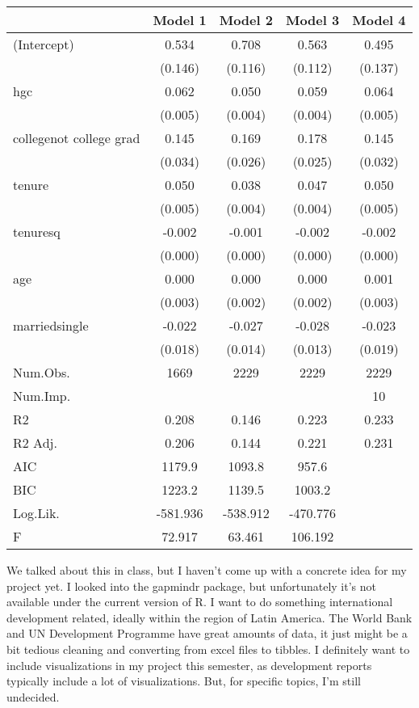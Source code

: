 \documentclass{homework}
\begin{document}
\begin{table}[h]
\centering
\begin{tabular}[t]{lcccc}
\toprule
  & Model 1 & Model 2 & Model 3 & Model 4\\
\midrule
(Intercept) & 0.534 & 0.708 & 0.563 & 0.495\\
 & (0.146) & (0.116) & (0.112) & (0.137)\\
hgc & 0.062 & 0.050 & 0.059 & 0.064\\
 & (0.005) & (0.004) & (0.004) & \vphantom{1} (0.005)\\
collegenot college grad & 0.145 & 0.169 & 0.178 & 0.145\\
 & (0.034) & (0.026) & (0.025) & (0.032)\\
tenure & 0.050 & 0.038 & 0.047 & 0.050\\
 & (0.005) & (0.004) & (0.004) & (0.005)\\
tenuresq & -0.002 & -0.001 & -0.002 & -0.002\\
 & (0.000) & (0.000) & (0.000) & (0.000)\\
age & 0.000 & 0.000 & 0.000 & 0.001\\
 & (0.003) & (0.002) & (0.002) & (0.003)\\
marriedsingle & -0.022 & -0.027 & -0.028 & -0.023\\
 & (0.018) & (0.014) & (0.013) & (0.019)\\
\midrule
Num.Obs. & 1669 & 2229 & 2229 & 2229\\
Num.Imp. &  &  &  & 10\\
R2 & 0.208 & 0.146 & 0.223 & 0.233\\
R2 Adj. & 0.206 & 0.144 & 0.221 & 0.231\\
AIC & 1179.9 & 1093.8 & 957.6 & \\
BIC & 1223.2 & 1139.5 & 1003.2 & \\
Log.Lik. & -581.936 & -538.912 & -470.776 & \\
F & 72.917 & 63.461 & 106.192 & \\
\bottomrule
\end{tabular}
\end{table}

\exercise
We talked about this in class, but I haven't come up with a concrete idea for my project yet. I looked into the gapmindr package, but unfortunately it's not available under the current version of R. I want to do something international development related, ideally within the region of Latin America. The World Bank and UN Development Programme have great amounts of data, it just might be a bit tedious cleaning and converting from excel files to tibbles. I definitely want to include visualizations in my project this semester, as development reports typically include a lot of visualizations. But, for specific topics, I'm still undecided.
\end{document}
